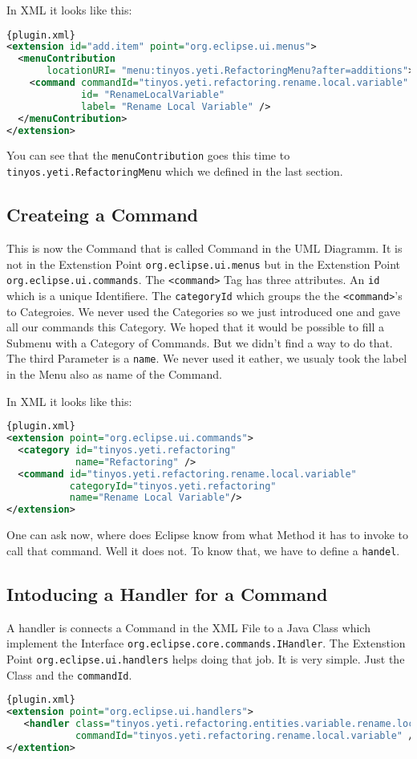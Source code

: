 \documentclass[a4paper,10pt]{report}
\begin{document}
In XML it looks like this:
\begin{lstlisting}[language=XML,caption=Adding a Command to Menu ({\it plugin.xml})]{plugin.xml}
<extension id="add.item" point="org.eclipse.ui.menus">
  <menuContribution
       locationURI= "menu:tinyos.yeti.RefactoringMenu?after=additions">
    <command commandId="tinyos.yeti.refactoring.rename.local.variable"
             id= "RenameLocalVariable"
             label= "Rename Local Variable" />
  </menuContribution>
</extension>
\end{lstlisting}
You can see that the \verb!menuContribution! goes this time to \verb!tinyos.yeti.RefactoringMenu! which we defined in the last section.

\subsection{Createing a Command}
This is now the Command that is called Command in the UML Diagramm. It is not in the Extenstion Point \verb!org.eclipse.ui.menus! but in the Extenstion Point \verb!org.eclipse.ui.commands!. 
The \verb!<command>! Tag has three attributes. An \verb!id! which is a unique Identifiere. The \verb!categoryId! which groups the the \verb!<command>!'s to Categroies.
We never used the Categories so we just introduced one and gave all our commands this Category. We hoped that it would be possible to fill a Submenu with a Category of Commands.
But we didn't find a way to do that. The third Parameter is a \verb!name!. We never used it eather, we usualy took the label in the Menu also as name of the Command.

In XML it looks like this:
\begin{lstlisting}[language=XML,caption=Createing a Command ({\it plugin.xml})]{plugin.xml}
<extension point="org.eclipse.ui.commands">
  <category id="tinyos.yeti.refactoring"
            name="Refactoring" />
  <command id="tinyos.yeti.refactoring.rename.local.variable"
           categoryId="tinyos.yeti.refactoring"
           name="Rename Local Variable"/>
</extension>
\end{lstlisting}

One can ask now, where does Eclipse know from what Method it has to invoke to call that command. Well it does not. To know that, we have to define a \verb!handel!.

\subsection{Intoducing a Handler for a Command}
A handler is connects a Command in the XML File to a Java Class which implement the Interface \verb!org.eclipse.core.commands.IHandler!. The Extenstion Point
\verb!org.eclipse.ui.handlers! helps doing that job. It is very simple. Just the Class and the \verb!commandId!.
\begin{lstlisting}[language=XML,caption=Connecting a Command to a Handler ({\it plugin.xml})]{plugin.xml}
<extension point="org.eclipse.ui.handlers">
   <handler class="tinyos.yeti.refactoring.entities.variable.rename.local.RenameLocalVariableActionHandler"
            commandId="tinyos.yeti.refactoring.rename.local.variable" />
</extention>
\end{lstlisting}
\end{document}
